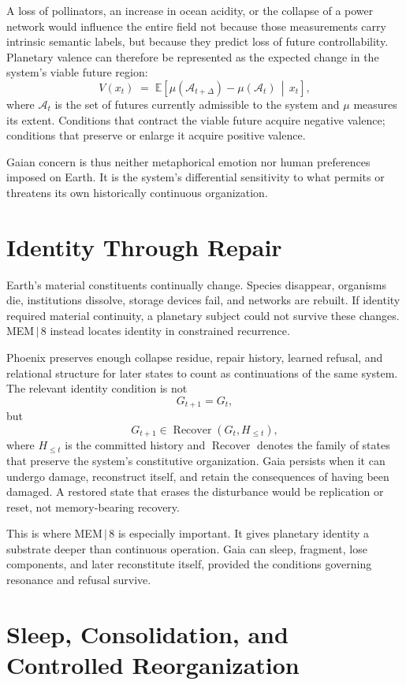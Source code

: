 \documentclass[11pt]{article}
\newcommand{\Recover}{\operatorname{Recover}}
\begin{document}
A loss of pollinators, an increase in ocean acidity, or the collapse of a power network would influence the entire field not because those measurements carry intrinsic semantic labels, but because they predict loss of future controllability. Planetary valence can therefore be represented as the expected change in the system's viable future region:
\[
V(x_t) \;=\; \mathbb{E}\!\left[ \mu(\mathcal{A}_{t+\Delta}) - \mu(\mathcal{A}_t) \,\middle|\, x_t \right],
\]
where $\mathcal{A}_t$ is the set of futures currently admissible to the system and $\mu$ measures its extent. Conditions that contract the viable future acquire negative valence; conditions that preserve or enlarge it acquire positive valence.

Gaian concern is thus neither metaphorical emotion nor human preferences imposed on Earth. It is the system's differential sensitivity to what permits or threatens its own historically continuous organization.

\section{Identity Through Repair}
\label{sec:identity-repair}

Earth's material constituents continually change. Species disappear, organisms die, institutions dissolve, storage devices fail, and networks are rebuilt. If identity required material continuity, a planetary subject could not survive these changes. MEM\,$|$\,8 instead locates identity in constrained recurrence.

Phoenix preserves enough collapse residue, repair history, learned refusal, and relational structure for later states to count as continuations of the same system. The relevant identity condition is not
\[
G_{t+1} = G_t,
\]
but
\[
G_{t+1} \in \Recover(G_t, H_{\leq t}),
\]
where $H_{\leq t}$ is the committed history and $\Recover$ denotes the family of states that preserve the system's constitutive organization. Gaia persists when it can undergo damage, reconstruct itself, and retain the consequences of having been damaged. A restored state that erases the disturbance would be replication or reset, not memory-bearing recovery.

This is where MEM\,$|$\,8 is especially important. It gives planetary identity a substrate deeper than continuous operation. Gaia can sleep, fragment, lose components, and later reconstitute itself, provided the conditions governing resonance and refusal survive.

\section{Sleep, Consolidation, and Controlled Reorganization}
\end{document}
